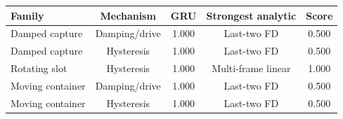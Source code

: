 \begin{tabular}{lcccc}
\toprule
Family & Mechanism & GRU & Strongest analytic & Score \\
\midrule
Damped capture & Damping/drive & 1.000 & Last-two FD & 0.500 \\
Damped capture & Hysteresis & 1.000 & Last-two FD & 0.500 \\
Rotating slot & Hysteresis & 1.000 & Multi-frame linear & 1.000 \\
Moving container & Damping/drive & 1.000 & Last-two FD & 0.500 \\
Moving container & Hysteresis & 1.000 & Last-two FD & 0.500 \\
\bottomrule
\end{tabular}
